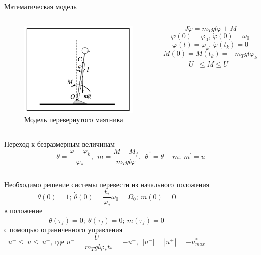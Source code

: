 \documentclass[10pt]{beamer}
\begin{document}
\begin{frame}{Математическая модель}
	\begin{columns}
		\begin{figure}[h!]
			\includegraphics[width=1\linewidth]{images/inverse_pendulum.png}
			\caption{Модель перевернутого маятника}
		\end{figure}

		\[
			J\ddot{\varphi}=m_Tgl\varphi+M
		\]
		\[
			\varphi(0)=\varphi_0,\, \dot{\varphi}(0)=\omega_0
		\]
		\[
			\varphi(t)=\varphi_k,\, \dot{\varphi}(t_k)=0
		\]
		\[
			M(0)=M(t_k)=-m_Tgl\varphi_k
		\]
		\[
			U^-\leq\dot{M}\leq U^+
		\]
	\end{columns}
\end{frame}


\begin{frame}{Переход к безразмерным величинам}
	\[
		\theta=\frac{\varphi-\varphi_k}{\varphi_\ast},\ \ m=\frac{M-M_f}{m_Tgl\varphi}, \ \ \theta^{''}=\theta+m;\ m^{'}=u
	\]
	\begin{columns}
		\column{0.9\textwidth}
		Необходимо решение системы
		перевести из начального положения
		\[
			\theta(0)=1;\ \dot{\theta}(0)=\frac{t_\ast}{\varphi_\ast}\omega_0=\Omega_0;\ m(0)=0
		\]
		в положение
		\[
			\theta(\tau_f)=0;\ \dot{\theta}(\tau_f)=0;\ m(\tau_f)=0
		\]
		с помощью ограниченного управления
		\[
			u^-\le\ u\le\ u^+,\ \text{где } u^-=\frac{U^-}{m_Tgl\varphi_\ast t_\ast}=-u^+, \ \ |u^-|=|u^+|=-u_{max}^*
		\]

	\end{columns}
\end{frame}
\end{document}
